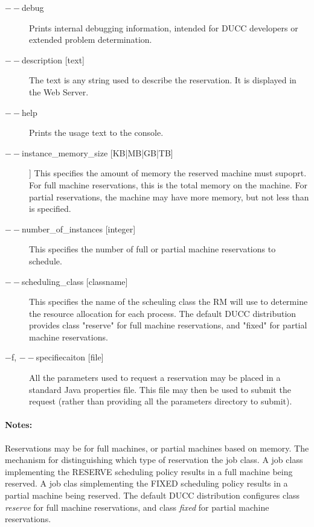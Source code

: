         \begin{description}

            \item[$--$debug ]          
              Prints internal debugging information, intended for DUCC developers or extended problem determination.
              
            \item[$--$description {[text]}]               
              The text is any string used to describe the reservation. It is displayed in the Web Server. 
              
            \item[$--$help ]             
              Prints the usage text to the console. 
                            
            \item[$--$instance\_memory\_size {[KB|MB|GB|TB]}]]               
              This specifies the amount of memory the reserved machine must supoprt. For full machine 
              reservations, this is the total memory on the machine. For partial reservations, the machine 
              may have more memory, but not less than is specified. 

            \item[$--$number\_of\_instances {[integer]}]               
              This specifies the number of full or partial machine reservations to schedule. 
                            
            \item[$--$scheduling\_class {[classname]}]               
              This specifies the name of the scheuling class the RM will use to determine the resource 
              allocation for each process. The default DUCC distribution provides class "reserve" for full 
              machine reservations, and "fixed" for partial machine reservations. 
              
            \item[$-$f, $--$specifiecaiton {[file]}]               
              All the parameters used to request a reservation may be placed in a standard Java 
              properties file. This file may then be used to submit the request (rather than providing all 
              the parameters directory to submit). 

        \end{description}
            
    \paragraph{Notes:}
    Reservations may be for full machines, or partial machines based on memory. The mechanism for
    distinguishing which type of reservation the job class. A job class implementing the RESERVE
    scheduling policy results in a full machine being reserved. A job clas simplementing the FIXED
    scheduling policy results in a partial machine being reserved. The default DUCC distribution
    configures class {\em reserve} for full machine reservations, and class {\em fixed} for partial
    machine reservations.


